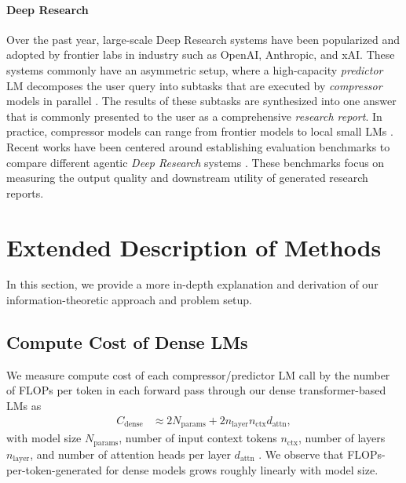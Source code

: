 \documentclass{article} %
\begin{document}

\paragraph*{Deep Research} Over the past year, large-scale Deep Research systems have been popularized and adopted by frontier labs in industry such as OpenAI, Anthropic, and xAI. These systems commonly have an asymmetric setup, where a high-capacity \textit{predictor} LM decomposes the user query into subtasks that are executed by \textit{compressor} models in parallel \citep{schluntz2025building}. The results of these subtasks are synthesized into one answer that is commonly presented to the user as a comprehensive \textit{research report}. In practice, compressor models can range from frontier models \citep{hadfield2025multiagent, schluntz2025building} to local small LMs \citep{narayan2025minions}. Recent works have been centered around establishing evaluation benchmarks to compare different agentic \textit{Deep Research} systems \citep{du2025deepresearch}. These benchmarks focus on measuring the output quality and downstream utility of generated research reports. 

\section{Extended Description of Methods}
\label{appendix-methods}

In this section, we provide a more in-depth explanation and derivation of our information-theoretic approach and problem setup.

\subsection{Compute Cost of Dense LMs}
\label{sec:appendix-compute-cost}
We measure compute cost of each compressor/predictor LM call by the number of FLOPs per token in each forward pass through our dense transformer-based LMs as
\begin{align*}
    C_{\mathrm{dense}} &\approx 2N_{\mathrm{params}} + 2n_{\mathrm{layer}}n_{\mathrm{ctx}}d_{\mathrm{attn}},
\end{align*}
with model size \(N_{\mathrm{params}}\), number of input context tokens \(n_{\mathrm{ctx}}\), number of layers \(n_{\mathrm{layer}}\), and number of attention heads per layer \(d_{\mathrm{attn}}\) \citep{scalinglaws}. We observe that FLOPs-per-token-generated for dense models grows roughly linearly with model size.
\end{document}
